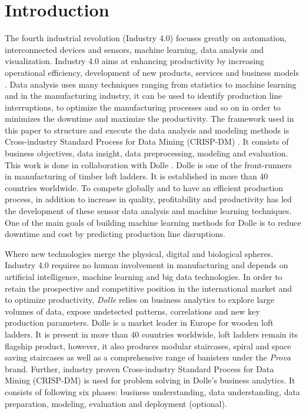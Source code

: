 \documentclass[runningheads]{llncs}
\begin{document}
\section{Introduction}
The fourth industrial revolution (Industry 4.0) focuses greatly on automation, interconnected devices and sensors,  machine learning, data analysis and visualization. Industry 4.0 aims at enhancing productivity by increasing operational efficiency, development of new products, services and business models \cite{industry}. Data analysis uses many techniques ranging from statistics to machine learning and in the manufacturing industry, it can be used to identify production line interruptions, to optimize the manufacturing processes and so on in order to minimizes the downtime and maximize the productivity. The framework used in this paper to structure and execute the data analysis and modeling methods is Cross-industry Standard Process for Data Mining (CRISP-DM) \cite{CRM}. It consists of business objectives, data insight, data preprocessing, modeling and evaluation. This work is done in collaboration with Dolle \cite{Dolle}. Dolle is one of the front-runners in  manufacturing of timber loft ladders. It is established in more than 40 countries worldwide. To compete globally and to have an efficient production process, in addition to increase in quality, profitability and productivity has led the development of these sensor data analysis and machine learning techniques. One of the main goals of building machine learning methods for Dolle is to reduce downtime and cost by predicting production line disruptions.



\iffalse
 Where new technologies merge the physical, digital and biological spheres. Industry 4.0 requires no human involvement in manufacturing and depends on artificial intelligence, machine learning and big data technologies. In order to retain the prospective and competitive position in the international market and to optimize productivity, \textit{Dolle} \cite{Dolle} relies on business analytics to explore large volumes of data, expose undetected patterns, correlations and new key production parameters. Dolle is a market leader in Europe for wooden loft ladders. It is present in more than 40 countries worldwide, loft ladders remain its flagship product, however, it also produces modular staircases, spiral and space saving staircases as well as a comprehensive range of banisters under the \textit{Prova} brand. Further, industry proven Cross-industry Standard Process for Data Mining (CRISP-DM) \cite{CRM} is used for problem solving in Dolle's business analytics. It consists of following six phases: business understanding, data understanding, data preparation, modeling, evaluation and deployment (optional). 
\end{document}
